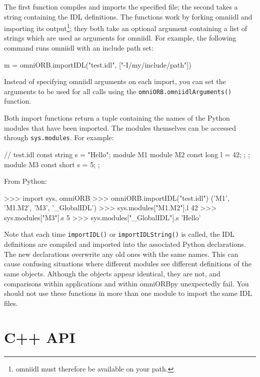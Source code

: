 \documentclass[11pt,oneside,a4paper]{book}
\newcommand{\code}[1]{\texttt{#1}}
\newcommand{\op}[1]{\texttt{#1()}}
\begin{document}
The first function compiles and imports the specified file; the second
takes a string containing the IDL definitions. The functions work by
forking omniidl and importing its output\footnote{omniidl must
therefore be available on your path.}; they both take an optional
argument containing a list of strings which are used as arguments for
omniidl. For example, the following command runs omniidl with an
include path set:

\begin{pylisting}
m = omniORB.importIDL("test.idl", ["-I/my/include/path"])
\end{pylisting}

Instead of specifying omniidl arguments on each import, you can set
the arguments to be used for all calls using the
\op{omniORB.omniidlArguments} function.

Both import functions return a tuple containing the names of the
Python modules that have been imported. The modules themselves can be
accessed through \code{sys.modules}. For example:

\begin{idllisting}
// test.idl
const string s = "Hello";
module M1 {
  module M2 {
    const long l = 42;
  };
};
module M3 {
  const short s = 5;
};
\end{idllisting}

\noindent From Python:

\begin{pylisting}
>>> import sys, omniORB
>>> omniORB.importIDL("test.idl")
('M1', 'M1.M2', 'M3', '_GlobalIDL')
>>> sys.modules["M1.M2"].l
42
>>> sys.modules["M3"].s
5
>>> sys.modules["_GlobalIDL"].s
'Hello'
\end{pylisting}

Note that each time \op{importIDL} or \op{importIDLString} is called,
the IDL definitions are compiled and imported into the associated
Python declarations. The new declarations overwrite any old ones with
the same names. This can cause confusing situations where different
modules see different definitions of the same objects. Although the
objects appear identical, they are not, and comparisons within
applications and within omniORBpy unexpectedly fail. You should not
use these functions in more than one module to import the same IDL
files.


\section{C++ API}
\end{document}
